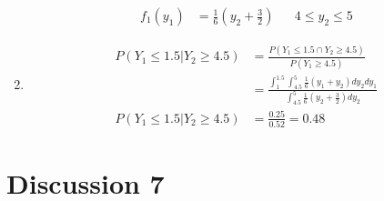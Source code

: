 \documentclass[13pt]{article}
\begin{document}
\begin{enumerate}[label=(\alph*)]
\begin{align*}
    f_1(y_1) &=  \frac{1}{6} \left( y_2 + \frac{3}{2} \right) && 4 \leq y_2 \leq 5
  \end{align*}
\item
  \begin{align*}
    P(Y_1 \leq 1.5 | Y_2 \geq 4.5) &= \frac{P(Y_1 \leq 1.5 \cap Y_2 \geq 4.5)}{P(Y_1 \geq 4.5)} \\
                                   &= \frac{\int_{1}^{1.5} \int_{4.5}^{5} \frac{1}{6} (y_1 + y_2) dy_2 dy_1}
                                     {\int_{4.5}^{5} \frac{1}{6} \left( y_2 + \frac{3}{2} \right)dy_2} \\
    P(Y_1 \leq 1.5 | Y_2 \geq 4.5) &= \frac{0.25}{0.52} = 0.48
  \end{align*}
\end{enumerate}

\newpage
\section*{Discussion 7}
\end{document}
